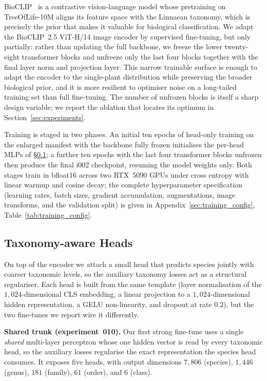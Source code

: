 BioCLIP~\cite{stevens2024bioclip} is a contrastive vision-language model whose pretraining on
TreeOfLife-10M aligns its feature space with the Linnaean taxonomy, which is precisely the prior
that makes it valuable for biological classification. We adapt the BioCLIP~2.5 ViT-H/14 image
encoder by supervised fine-tuning, but only partially: rather than updating the full backbone,
we freeze the lower twenty-eight transformer blocks and unfreeze only the last four blocks
together with the final layer norm and projection layer. This narrow trainable surface is enough
to adapt the encoder to the single-plant distribution while preserving the broader biological
prior, and it is more resilient to optimiser noise on a long-tailed training set than full
fine-tuning. The number of unfrozen blocks is itself a sharp design variable; we report the
ablation that locates its optimum in Section~\ref{sec:experiments}.

Training is staged in two phases. An initial ten epochs of head-only training on the enlarged
manifest with the backbone fully frozen initialises the per-head MLPs of
\S\ref{sec:bioclip25_010}; a further ten epochs with the last four transformer blocks unfrozen
then produce the final i002 checkpoint, resuming the model weights only. Both stages train in
bfloat16 across two RTX~5090 GPUs under cross entropy with linear warmup and cosine decay; the
complete hyperparameter specification (learning rates, batch sizes, gradient accumulation,
augmentations, image transforms, and the validation split) is given in
Appendix~\ref{sec:training_config}, Table~\ref{tab:training_config}.

\subsection{Taxonomy-aware Heads}
\label{sec:bioclip25_010}

On top of the encoder we attach a small head that predicts species jointly with coarser
taxonomic levels, so the auxiliary taxonomy losses act as a structural regulariser. Each head is
built from the same template (layer normalisation of the $1{,}024$-dimensional CLS embedding, a
linear projection to a $1{,}024$-dimensional hidden representation, a GELU non-linearity, and
dropout at rate $0.2$), but the two fine-tunes we report wire it differently.

\textbf{Shared trunk (experiment~010).} Our first strong fine-tune uses a single \emph{shared}
multi-layer perceptron whose one hidden vector is read by every taxonomic head, so the auxiliary
losses regularise the exact representation the species head consumes. It exposes five heads, with
output dimensions $7{,}806$ (species), $1{,}446$ (genus), $181$ (family), $61$ (order), and $6$
(class).

